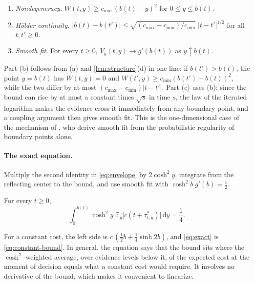 \documentclass[11pt]{article}
\theoremstyle{definition}
\theoremstyle{remark}
\newcommand{\E}{\mathbb{E}}
\newcommand{\dd}{\,\mathrm{d}}
\begin{document}
\begin{proposition}[Regularity]
\label{prop:regularity}
\begin{enumerate}
  \item[(a)] \emph{Nondegeneracy.} $W(t, y) \ge c_{\min}\,(b(t) - y)^2$ for $0 \le y \le b(t)$.
  \item[(b)] \emph{Hölder continuity.}
    $|b(t) - b(t')| \le \sqrt{(c_{\max} - c_{\min})/c_{\min}}\;|t - t'|^{1/2}$ for all $t, t' \ge 0$.
  \item[(c)] \emph{Smooth fit.} For every $t \ge 0$, $V_y(t, y) \to g'(b(t))$ as $y \uparrow b(t)$.
\end{enumerate}
\end{proposition}

Part (b) follows from (a) and \cref{lem:structure}(d) in one line: if $b(t') > b(t)$, the point
$y = b(t)$ has $W(t, y) = 0$ and $W(t', y) \ge c_{\min}(b(t') - b(t))^2$, while the two differ by
at most $(c_{\max} - c_{\min})|t - t'|$. Part (c) uses (b): since the bound can rise by at most a
constant times $\sqrt{s}$ in time $s$, the law of the iterated logarithm makes the evidence cross
it immediately from any boundary point, and a coupling argument then gives smooth fit. This is
the one-dimensional case of the mechanism of \citet{deangelis2020}, who derive smooth fit from
the probabilistic regularity of boundary points alone.

\paragraph{The exact equation.}
Multiply the second identity in \eqref{eq:envelope} by $2\cosh^2 y$, integrate from the reflecting
center to the bound, and use smooth fit with $\cosh^2 b\; g'(b) = \tfrac12$.

\begin{proposition}
\label{prop:exact}
For every $t \ge 0$,
\begin{equation}
  \int_0^{b(t)} \cosh^2 y\;\E_y\bigl[c(t + \tau^*_{t,y})\bigr]\dd y = \frac14.
  \label{eq:exact}
\end{equation}
\end{proposition}

For a constant cost, the left side is $c\,(\tfrac12 b + \tfrac14\sinh 2b)$, and \eqref{eq:exact}
is \eqref{eq:constant-bound}. In general, the equation says that the bound sits where the
$\cosh^2$-weighted average, over evidence levels below it, of the expected cost at the moment of
decision equals what a constant cost would require. It involves no derivative of the bound, which
makes it convenient to linearize.
\end{document}
